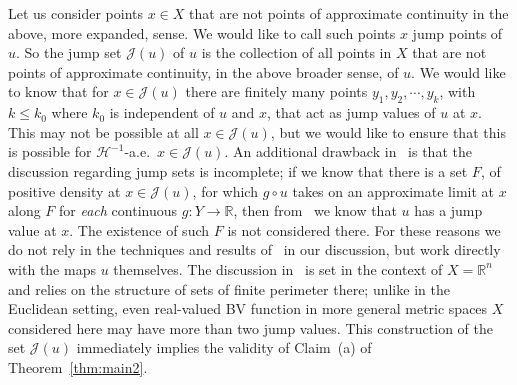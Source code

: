 \documentclass[11pt, letterpaper]{amsart} %
\newcommand*{\R}{{\mathbb R}}
\numberwithin{equation}{section}
\theoremstyle{plain}
\theoremstyle{definition}
\begin{document}
{Let us consider points $x\in X$ that are not points of approximate continuity in the above, more expanded, sense. 
We would like to call such points $x$ jump points of $u$. So the jump set $\mathcal{J}(u)$ 
of $u$ is the collection of all points in $X$
that are not points of approximate continuity, in the above broader sense, of $u$. We would like to know that 
for $x\in \mathcal{J}(u)$ there are finitely many points 
$y_1,y_2,\cdots, y_k$, with $k\le k_0$ where $k_0$ is independent of $u$ and $x$,
that act as jump values of $u$ at $x$. This may not be possible at all $x\in \mathcal{J}(u)$, but we would like to ensure that
this is possible for $\mathcal{H}^{-1}$-a.e.~$x\in \mathcal{J}(u)$.
An additional drawback in~\cite{Ambrosio1990}
is that the discussion regarding jump sets is incomplete; if we know that there is a set $F$, of positive density 
at $x\in \mathcal{J}(u)$,
for which $g\circ u$ takes on an approximate limit at $x$ along $F$ for \emph{each} continuous $g:Y\to\R$, then 
from~\cite[Proposition~1.1]{Ambrosio1990} we know that $u$ has a jump value at $x$. The existence of such $F$ is not
considered there. For these reasons we do not rely in the techniques and  
results of~\cite{Ambrosio1990} in our discussion, but work directly with the maps $u$ themselves.
The discussion in~\cite{Ambrosio1990-II} is set in the context of $X=\R^n$ and relies on the structure of sets of finite
perimeter there; unlike in the Euclidean setting, even real-valued BV function in more general metric spaces $X$ 
considered here may have more than two jump values. This construction of the set $\mathcal{J}(u)$ immediately
implies the validity of Claim~(a) of Theorem~\ref{thm:main2}.

}
\end{document}
